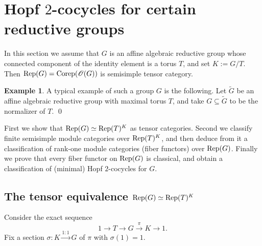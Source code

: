 \documentclass{amsart}
\theoremstyle{definition}
\newtheorem{example}[theorem]{Example}
\newcommand{\Rep}{{\rm Rep}}
\numberwithin{equation}{section}
\begin{document}
\section{Hopf $2$-cocycles for certain reductive groups}\label{sec:The reductive case} 

In this section we assume that $G$ is an affine algebraic reductive group whose connected component of the identity element is a torus $T$, and set $K:=G/T$. Then $\Rep(G)={\rm Corep}(\mathscr{O}(G))$ is semisimple tensor category.

\begin{example}
A typical example of such a group $G$ is the following. Let $\tilde{G}$ be an affine algebraic reductive group with maximal torus $T$, and take $G\subseteq \tilde{G}$ to be the normalizer of $T$.
%
\qed
\end{example}

First we show that $\Rep(G)\simeq\Rep(T)^K$ as tensor categories. Second we classify 
finite semisimple module categories over $\Rep(T)^K$, and then deduce from it a classification of rank-one module categories
(fiber functors) over $\Rep(G)$. Finally we prove that every fiber functor on $\Rep(G)$ is classical, and obtain a classification of (minimal) Hopf $2$-cocycles for $G$.

\subsection{The tensor equivalence $\Rep(G)\simeq\Rep(T)^K$}\label{sec:The tensor equivalence}
Consider the exact sequence
\begin{equation}\label{sesalgr}
1\to T\to G\xrightarrow{\pi}K\to 1.
\end{equation}
Fix a section $\sigma:K\xrightarrow{1:1} G$ of $\pi$ with $\sigma(1)=1$.
\end{document}
